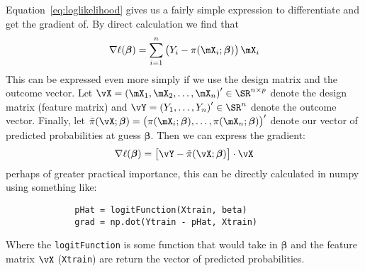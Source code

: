 \documentclass[10pt]{article}
\begin{document}
Equation~\eqref{eq:loglikelihood} gives us a fairly simple expression to differentiate and get the gradient of. By direct calculation we find that 
\begin{equation}
	\label{eq:ellGrad}
	\nabla \ell(\boldsymbol{\beta}) = \sum_{i=1}^n \left(Y_i -\pi(\mX_i; \boldsymbol{\beta})\right)\mX_i
\end{equation}
This can be expressed even more simply if we use the design matrix and the outcome vector. Let \(\vX = \left(\mX_1, \mX_2, \dots, \mX_n\right)' \in \SR^{n \times p}\) denote the design matrix (feature matrix) and \(\vY = \left(Y_1, \dots, Y_n\right)' \in \SR^n\) denote the outcome vector. Finally, let \(\tilde{\pi}(\vX;\boldsymbol{\beta}) = \left(\pi(\mX_i;\boldsymbol{\beta}),\dots, \pi(\mX_n;\boldsymbol{\beta})\right)'\) denote our vector of predicted probabilities at guess \(\boldsymbol{\beta}\). Then we can express the gradient: 
\begin{equation}
	\label{eq:matGrad}
	\nabla \ell(\boldsymbol{\beta}) = \left[\vY -\tilde\pi(\vX;\boldsymbol{\beta}) \right]\cdot\vX
\end{equation}
perhaps of greater practical importance, this can be directly calculated in numpy using something like:
\begin{figure}[h!]
	\centering
	\begin{BVerbatim}
		pHat = logitFunction(Xtrain, beta)
		grad = np.dot(Ytrain - pHat, Xtrain)
	\end{BVerbatim}
\end{figure}

Where the \verb|logitFunction| is some function that would take in \(\boldsymbol{\beta}\) and the feature matrix \(\vX\) (\verb|Xtrain|) are return the vector of predicted probabilities.
\end{document}
